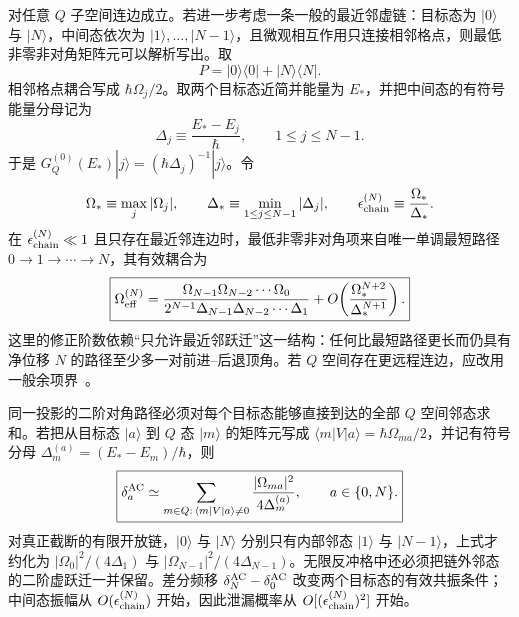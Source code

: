  对任意 $Q$ 子空间连边成立。若进一步考虑一条一般的最近邻虚链：目标态为 $|0\rangle$ 与 $|N\rangle$，中间态依次为 $|1\rangle,\ldots,|N-1\rangle$，且微观相互作用只连接相邻格点，则最低非零非对角矩阵元可以解析写出。取
\begin{equation*}
 P=|0\rangle\langle0|+|N\rangle\langle N|.
\end{equation*}
相邻格点耦合写成 $\hbar\Omega_j/2$。取两个目标态近简并能量为 $E_*$，并把中间态的有符号能量分母记为
\begin{equation*}
 \Delta_j\equiv\frac{E_*-E_j}{\hbar},
 \qquad 1\le j\le N-1.
\end{equation*}
于是 $G_Q^{(0)}(E_*)|j\rangle=(\hbar\Delta_j)^{-1}|j\rangle$。令
\begin{equation*}
 \Omega_*\equiv\max_j|\Omega_j|,
 \qquad
 \Delta_*\equiv\min_{1\le j\le N-1}|\Delta_j|,
 \qquad
 \epsilon_{\rm chain}^{(N)}\equiv\frac{\Omega_*}{\Delta_*}.
\end{equation*}
在 $\epsilon_{\rm chain}^{(N)}\ll1$ 且只存在最近邻连边时，最低非零非对角项来自唯一单调最短路径 $0\to1\to\cdots\to N$，其有效耦合为
\begin{equation}
 \boxed{
 \Omega_{\rm eff}^{(N)}
 =\frac{\Omega_{N-1}\Omega_{N-2}\cdots\Omega_0}
 {2^{N-1}\Delta_{N-1}\Delta_{N-2}\cdots\Delta_1}
 +O\!\left(\frac{\Omega_*^{N+2}}{\Delta_*^{N+1}}\right).}
 \label{eq:nth-bragg-effective-rabi-dp83}
\end{equation}
这里的修正阶数依赖“只允许最近邻跃迁”这一结构：任何比最短路径更长而仍具有净位移 $N$ 的路径至少多一对前进--后退顶角。若 $Q$ 空间存在更远程连边，应改用一般余项界~。

同一投影的二阶对角路径必须对每个目标态能够直接到达的全部 $Q$ 空间邻态求和。若把从目标态 $|a\rangle$ 到 $Q$ 态 $|m\rangle$ 的矩阵元写成 $\langle m|V|a\rangle=\hbar\Omega_{ma}/2$，并记有符号分母 $\Delta_m^{(a)}=(E_*-E_m)/\hbar$，则
\begin{equation}
 \boxed{
 \delta_a^{\rm AC}
 \simeq
 \sum_{m\in Q:\,\langle m|V|a\rangle\ne0}
 \frac{|\Omega_{ma}|^2}{4\Delta_m^{(a)}},
 \qquad a\in\{0,N\}.}
 \label{eq:nth-bragg-ac-stark-dp83}
\end{equation}
对真正截断的有限开放链，$|0\rangle$ 与 $|N\rangle$ 分别只有内部邻态 $|1\rangle$ 与 $|N-1\rangle$，上式才约化为 $|\Omega_0|^2/(4\Delta_1)$ 与 $|\Omega_{N-1}|^2/(4\Delta_{N-1})$。无限反冲格中还必须把链外邻态的二阶虚跃迁一并保留。差分频移 $\delta_N^{\rm AC}-\delta_0^{\rm AC}$ 改变两个目标态的有效共振条件；中间态振幅从 $O(\epsilon_{\rm chain}^{(N)})$ 开始，因此泄漏概率从 $O[(\epsilon_{\rm chain}^{(N)})^2]$ 开始。

